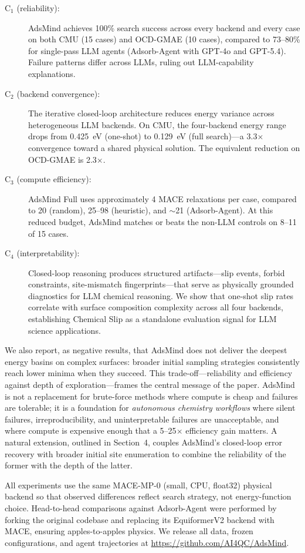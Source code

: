 \begin{description}
    \item[C$_1$ (reliability):] AdsMind achieves 100\% search success across every backend and every case on both CMU (15 cases) and OCD-GMAE (10 cases), compared to 73--80\% for single-pass LLM agents (Adsorb-Agent with GPT-4o and GPT-5.4). Failure patterns differ across LLMs, ruling out LLM-capability explanations.
    \item[C$_2$ (backend convergence):] The iterative closed-loop architecture reduces energy variance across heterogeneous LLM backends. On CMU, the four-backend energy range drops from 0.425~eV (one-shot) to 0.129~eV (full search)---a 3.3$\times$ convergence toward a shared physical solution. The equivalent reduction on OCD-GMAE is 2.3$\times$.
    \item[C$_3$ (compute efficiency):] AdsMind Full uses approximately 4 MACE relaxations per case, compared to 20 (random), 25--98 (heuristic), and $\sim$21 (Adsorb-Agent). At this reduced budget, AdsMind matches or beats the non-LLM controls on 8--11 of 15 cases.
    \item[C$_4$ (interpretability):] Closed-loop reasoning produces structured artifacts---slip events, forbid constraints, site-mismatch fingerprints---that serve as physically grounded diagnostics for LLM chemical reasoning. We show that one-shot slip rates correlate with surface composition complexity across all four backends, establishing Chemical Slip as a standalone evaluation signal for LLM science applications.
\end{description}

We also report, as negative results, that AdsMind does not deliver the deepest energy basins on complex surfaces: broader initial sampling strategies consistently reach lower minima when they succeed.
This trade-off---reliability and efficiency against depth of exploration---frames the central message of the paper.
AdsMind is not a replacement for brute-force methods where compute is cheap and failures are tolerable; it is a foundation for \textit{autonomous chemistry workflows} where silent failures, irreproducibility, and uninterpretable failures are unacceptable, and where compute is expensive enough that a 5--25$\times$ efficiency gain matters.
A natural extension, outlined in Section~4, couples AdsMind's closed-loop error recovery with broader initial site enumeration to combine the reliability of the former with the depth of the latter.

All experiments use the same MACE-MP-0 (small, CPU, float32) physical backend so that observed differences reflect search strategy, not energy-function choice.
Head-to-head comparisons against Adsorb-Agent were performed by forking the original codebase and replacing its EquiformerV2 backend with MACE, ensuring apples-to-apples physics.
We release all data, frozen configurations, and agent trajectories at \url{https://github.com/AI4QC/AdsMind}.
